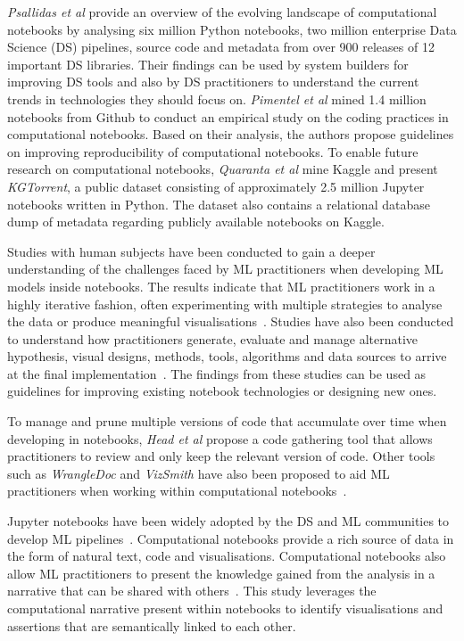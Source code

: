\documentclass[conference]{IEEEtran}
\begin{document}
\emph{Psallidas et al} provide an overview of the evolving landscape of computational notebooks by analysing six million Python notebooks, two million enterprise Data Science (DS) pipelines, source code and metadata from over 900 releases of 12 important DS libraries. Their findings can be used by system builders for improving DS tools and also by DS practitioners to understand the current trends in technologies they should focus on. \emph{Pimentel et al} mined 1.4 million notebooks from Github to conduct an empirical study on the coding practices in computational notebooks. Based on their analysis, the authors propose guidelines on improving reproducibility of computational notebooks. To enable future research on computational notebooks, \emph{Quaranta et al} mine Kaggle and present \textit{KGTorrent}, a public dataset consisting of approximately 2.5 million Jupyter notebooks written in Python. The dataset also contains a relational database dump of metadata regarding publicly available notebooks on Kaggle.

Studies with human subjects have been conducted to gain a deeper understanding of the challenges faced by ML practitioners when developing ML models inside notebooks. The results indicate that ML practitioners work in a highly iterative fashion, often experimenting with multiple strategies to analyse the data or produce meaningful visualisations~\cite{kandel2012enterprise, kery2018story, liu2019understanding, chattopadhyay2020wrong}. Studies have also been conducted to understand how practitioners generate, evaluate and manage alternative hypothesis, visual designs, methods, tools, algorithms and data sources to arrive at the final implementation~\cite{liu2019understanding,kandel2012enterprise}. The findings from these studies can be used as guidelines for improving existing notebook technologies or designing new ones.

To manage and prune multiple versions of code that accumulate over time when developing in notebooks, \emph{Head et al} propose a code gathering tool that allows practitioners to review and only keep the relevant version of code. Other tools such as \textit{WrangleDoc} and \textit{VizSmith} have also been proposed to aid ML practitioners when working within computational notebooks~\cite{yang2021subtle, bavishi2021vizsmith}.

Jupyter notebooks have been widely adopted by the DS and ML communities to develop ML pipelines~\cite{wang2020assessing,pimentel2019large,quaranta2021kgtorrent}. Computational notebooks provide a rich source of data in the form of natural text, code and visualisations. Computational notebooks also allow ML practitioners to present the knowledge gained from the analysis in a narrative that can be shared with others~\cite{rule2018exploration}. This study leverages the computational narrative present within notebooks to identify visualisations and assertions that are semantically linked to each other.
\end{document}
